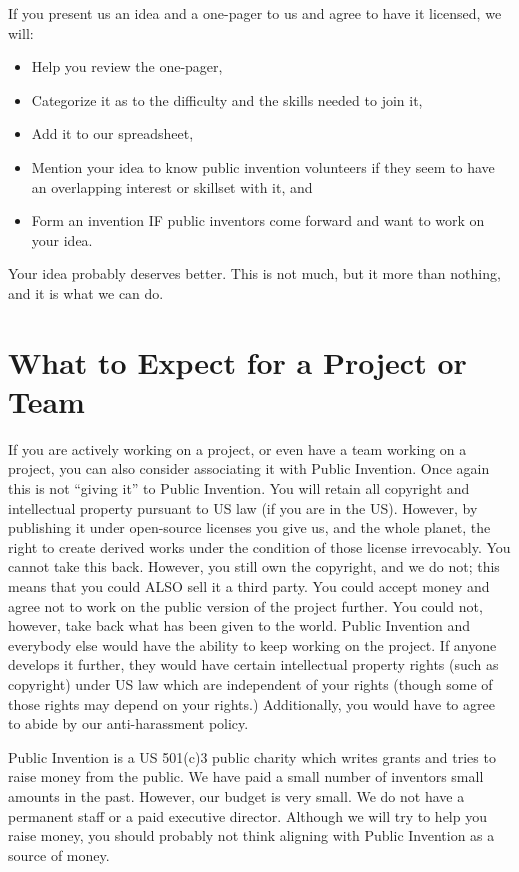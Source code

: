 \documentclass[
	fontsize=10pt, %
	twoside=false, %
	secnumdepth=1, %
]{kaobook}
\begin{document}
If you present us an idea and a one-pager to us and agree to have it licensed, we will:
\begin{itemize}
\item Help you review the one-pager,
\item Categorize it as to the difficulty and the skills needed to join it,
\item Add it to our spreadsheet,
  \item Mention your idea to know public invention volunteers if they seem to have an overlapping interest or skillset with it, and
  \item Form an invention IF public inventors come forward and want to work on your idea.
  \end{itemize}
Your idea probably deserves better. This is not much, but it more than nothing, and it is what we can do.

\section{What to Expect for a Project or Team}

If you are actively working on a project, or even have a team working on a project, you can also consider associating it with Public Invention.
Once again this is not ``giving it'' to Public Invention. You will retain all copyright and intellectual property pursuant to US law (if you are in the US).
However, by publishing it under open-source licenses you give us, and the whole planet, the right to create derived works under the condition of
those license irrevocably. You cannot take this back. However, you still own the copyright, and we do not; this means that you could ALSO sell it
a third party. You could accept money and agree not to work on the public version of the project further. You could not, however, take back what
has been given to the world. Public Invention and everybody else would have the ability to keep working on the project. If anyone develops it
further, they would have certain intellectual property rights (such as copyright) under US law which are independent of your rights (though some of
those rights may depend on your rights.) Additionally, you would have to agree to abide by our anti-harassment policy.

Public Invention is a US 501(c)3 public charity which writes grants and tries to raise money from the public.
We have paid a small number of inventors small amounts in the past. However, our budget is very small. We do not have a permanent staff or a paid executive
director. Although we will try to help you raise money, you should probably not think aligning with Public Invention as a source of money.
\end{document}
